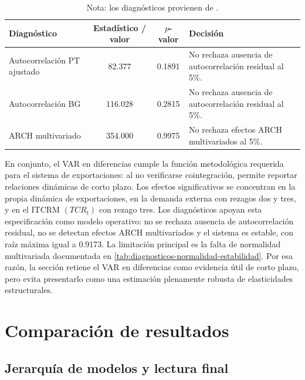 \documentclass[11pt,a4paper]{article}
\begin{document}
\begin{table}[H]
\centering
\caption{Diagnósticos residuales del VAR en diferencias de exportaciones.}
\label{tab:diagnosticos-var-diferencias-exportaciones}
\small
\begin{tabular}{lccp{6.2cm}}
\toprule
Diagnóstico & Estadístico / valor & \(p\)-valor & Decisión \\
\midrule
Autocorrelación PT ajustado & 82.377 & 0.1891 & No rechaza ausencia de autocorrelación residual al 5\%. \\
Autocorrelación BG & 116.028 & 0.2815 & No rechaza ausencia de autocorrelación residual al 5\%. \\
ARCH multivariado & 354.000 & 0.9975 & No rechaza efectos ARCH multivariados al 5\%. \\
\bottomrule
\end{tabular}
\caption*{\footnotesize Nota: los diagnósticos provienen de
.}
\end{table}

En conjunto, el VAR en diferencias cumple la función metodológica requerida
para el sistema de exportaciones: al no verificarse cointegración, permite
reportar relaciones dinámicas de corto plazo. Los efectos significativos se
concentran en la propia dinámica de exportaciones, en la demanda externa con
rezagos dos y tres, y en el ITCRM \((TCR_t)\) con rezago tres. Los diagnósticos
apoyan esta especificación como modelo operativo: no se rechaza ausencia de
autocorrelación residual, no se detectan efectos ARCH multivariados y el
sistema es estable, con raíz máxima igual a 0.9173. La limitación principal es
la falta de normalidad multivariada documentada en
\autoref{tab:diagnosticos-normalidad-estabilidad}. Por esa razón, la sección
retiene el VAR en diferencias como evidencia útil de corto plazo, pero evita
presentarlo como una estimación plenamente robusta de elasticidades
estructurales.
	
	\section{Comparación de resultados}
	\label{sec:comparacion}

	\subsection{Jerarquía de modelos y lectura final}
	\label{subsec:jerarquia-modelos}
	
\end{document}
